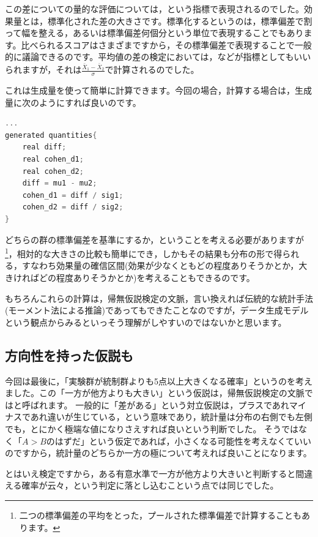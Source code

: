 \documentclass{ltjsbook}
\begin{document}
この差についての量的な評価については，という指標で表現されるのでした。効果量とは，標準化された差の大きさです。標準化するというのは，標準偏差で割って幅を整える，あるいは標準偏差何個分という単位で表現することでもあります。比べられるスコアはさまざまですから，その標準偏差で表現することで一般的に議論できるのです。平均値の差の検定においては，などが指標としてもいいられますが，それは$\frac{\bar{X}_1-\bar{X}_2}{\sigma}$で計算されるのでした。

これは生成量を使って簡単に計算できます。今回の場合，計算する場合は，生成量に次のようにすれば良いのです。
\begin{lstlisting}[language=C++,label={code::19_06},caption={生成量ブロックで効果量の算出}]
    ...
generated quantities{
    real diff;
    real cohen_d1;
    real cohen_d2;
    diff = mu1 - mu2;
    cohen_d1 = diff / sig1;
    cohen_d2 = diff / sig2;
}

\end{lstlisting}

どちらの群の標準偏差を基準にするか，ということを考える必要がありますが\footnote{二つの標準偏差の平均をとった，プールされた標準偏差で計算することもあります。}，相対的な大きさの比較も簡単にでき，しかもその結果も分布の形で得られる，すなわち効果量の確信区間(効果が少なくともどの程度ありそうかとか，大きければどの程度ありそうかとか)を考えることもできるのです。

もちろんこれらの計算は，帰無仮説検定の文脈，言い換えれば伝統的な統計手法(モーメント法による推論)であってもできたことなのですが，データ生成モデルという観点からみるといっそう理解がしやすいのではないかと思います。
\subsection{方向性を持った仮説も}
今回は最後に，「実験群が統制群よりも5点以上大きくなる確率」というのを考えました。この「一方が他方よりも大きい」という仮説は，帰無仮説検定の文脈ではと呼ばれます。
一般的に「差がある」という対立仮説は，プラスであれマイナスであれ違いが生じている，という意味であり，統計量は分布の右側でも左側でも，とにかく極端な値になりさえすれば良いという判断でした。
そうではなく「$A>B$のはずだ」という仮定であれば，小さくなる可能性を考えなくていいのですから，統計量のどちらか一方の極について考えれば良いことになります。

とはいえ検定ですから，ある有意水準で一方が他方より大きいと判断すると間違える確率が云々，という判定に落とし込むこという点では同じでした。
\end{document}
